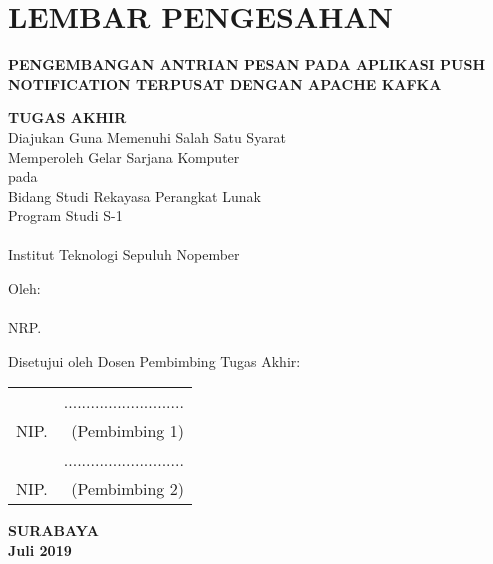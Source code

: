 \chapter{LEMBAR PENGESAHAN}
\small

\begin{center}
	\textbf{\MakeUppercase{Pengembangan Antrian Pesan pada Aplikasi Push Notification Terpusat dengan Apache Kafka}}
	\vspace*{0.3em}
	
	\textbf{TUGAS AKHIR} \\
	Diajukan Guna Memenuhi Salah Satu Syarat\\
	Memperoleh Gelar Sarjana Komputer\\
	pada\\
	Bidang Studi Rekayasa Perangkat Lunak\\
	Program Studi S-1 \jurusan\\
	\fakultas \\
	Institut Teknologi Sepuluh Nopember
	
	\vspace*{0.3em}
	
	Oleh:\\
	\textbf{\penulis} \\
	NRP. \nrp
	
	\vspace*{1.1em}
\end{center}

Disetujui oleh Dosen Pembimbing Tugas Akhir: \\
\vspace*{1.3em}

\begin{tabularx}{\linewidth}{ @{}l r }
	\pembimbingsatu & ........................... \vspace*{1.4em} \\
	NIP. \nikpembimbingsatu & (Pembimbing 1) \vspace*{2.6em} \\
	
	\pembimbingdua & ........................... \vspace*{1.4em} \\
	NIP. \nikpembimbingdua & (Pembimbing 2) \vspace*{0.9em}
\end{tabularx}

\begin{center}
	\textbf {SURABAYA} \\
	\textbf {Juli 2019}
\end{center}

\normalsize
\cleardoublepage